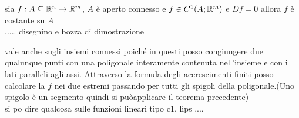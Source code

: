 \proposition
sia $f:A\subseteq \mathbb{R}^n \rightarrow \mathbb{R}^m$, $A$ è aperto connesso e $f\in C^1(A;\mathbb{R}^m)$ e $Df=0$ allora $f$ è costante su $A$\\
..... disegnino e bozza di dimostrazione

\observation vale anche sugli insiemi connessi poiché in questi posso congiungere due qualunque punti con una poligonale interamente contenuta nell'insieme e con i lati paralleli agli assi. Attraverso la formula degli accrescimenti finiti posso calcolare la $f$ nei due estremi passando per tutti gli spigoli della poligonale.(Uno spigolo è un segmento quindi si puòapplicare il teorema precedente)\\

si po dire qualcosa sulle funzioni lineari tipo c1, lips ....\\

